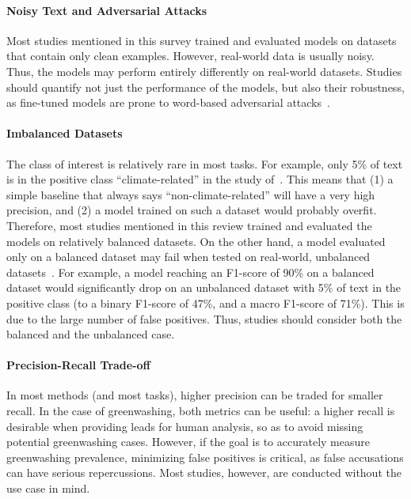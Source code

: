 \paragraph{Noisy Text and Adversarial Attacks} Most studies mentioned in this survey trained and evaluated models on datasets that contain only clean examples. However, real-world data is usually noisy. Thus, the models may perform entirely differently on real-world datasets. Studies should quantify not just the performance of the models, but also their robustness, as fine-tuned models are prone to word-based adversarial attacks~\cite{vinicius_woloszyn_towards_2021}.

\paragraph{Imbalanced Datasets} The class of interest is relatively rare in most tasks. For example, only 5\% of text is in the positive class ``climate-related'' in the study of~\citet{yu_climatebug_2024}. This means that (1) a simple baseline that always says ``non-climate-related'' will have a very high precision, and (2) a model trained on such a dataset would probably overfit. Therefore, most studies mentioned in this review trained and evaluated the models on relatively balanced datasets. 
On the other hand, a model evaluated only on a balanced dataset may fail when tested on real-world, unbalanced datasets~\cite{Friederich_climate_risk_disclosure}. For example, a model reaching an F1-score of 90\% on a balanced dataset would significantly drop on an unbalanced dataset with 5\% of text in the positive class (to a binary F1-score of 47\%, and a macro F1-score of 71\%). This is due to the large number of false positives. Thus, studies should consider both the balanced and the unbalanced case.

\paragraph{Precision-Recall Trade-off} In most methods (and most tasks), higher precision can be traded for smaller recall. In the case of greenwashing, both metrics can be useful:
a higher recall is desirable when providing leads for human analysis, so as to avoid missing potential greenwashing cases. However, if the goal is to accurately measure greenwashing prevalence, minimizing false positives is critical, as false accusations can have serious repercussions. Most studies, however, are conducted without the use case in mind.

